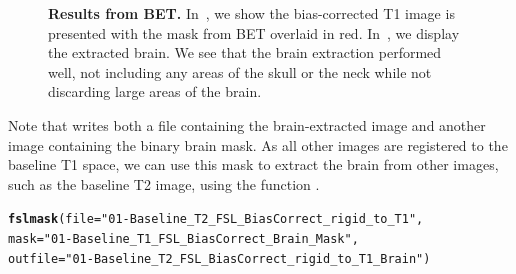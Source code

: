 \documentclass[a4paper]{report}\usepackage[]{graphicx}\usepackage[]{color}
\makeatletter
\newcommand{\hlstr}[1]{\textcolor[rgb]{0.192,0.494,0.8}{#1}}%
\newcommand{\hlstd}[1]{\textcolor[rgb]{0.345,0.345,0.345}{#1}}%
\newcommand{\hlkwc}[1]{\textcolor[rgb]{0.333,0.667,0.333}{#1}}%
\newcommand{\hlkwd}[1]{\textcolor[rgb]{0.737,0.353,0.396}{\textbf{#1}}}%
\newenvironment{kframe}{%
 \def\at@end@of@kframe{}%
 \ifinner\ifhmode%
  \def\at@end@of@kframe{\end{minipage}}%
  \begin{minipage}{\columnwidth}%
 \fi\fi%
 \def\FrameCommand##1{\hskip\@totalleftmargin \hskip-\fboxsep
 \colorbox{shadecolor}{##1}\hskip-\fboxsep
     \hskip-\linewidth \hskip-\@totalleftmargin \hskip\columnwidth}%
 \MakeFramed {\advance\hsize-\width
   \@totalleftmargin\z@ \linewidth\hsize
   \@setminipage}}%
 {\par\unskip\endMakeFramed%
 \at@end@of@kframe}
\newenvironment{knitrout}{}{} %
\newcommand\gobblepars{%
    \@ifnextchar\par%
        {\expandafter\gobblepars\@gobble}%
        {}}
\let\pkg=\strong
\DeclareRobustCommand\code{\bgroup\@noligs\@codex}
\makeatother
\begin{document}
\begin{article}
\begin{figure}
\hfill
\caption{{\bf Results from BET.} In~\protect{}, we show the bias-corrected T1 image is presented with the mask from BET overlaid in red.  In~\protect{}, we display the extracted brain.  We see that the brain extraction performed well, not including any areas of the skull or the neck while not discarding large areas of the brain.}
\label{fig:bet}
\end{figure}

Note that \code{fslbet} writes both a file containing the brain-extracted image and another image containing the binary brain mask.  As all other images are registered to the baseline T1 space, we can use this mask to extract the brain from other images, such as the baseline T2 image, using the \pkg{fslr} function \code{fslmask}.

\begin{knitrout}
\color{fgcolor}\begin{kframe}
\begin{alltt}
\hlkwd{fslmask}\hlstd{(}\hlkwc{file}\hlstd{=}\hlstr{"01-Baseline_T2_FSL_BiasCorrect_rigid_to_T1"}\hlstd{,}
        \hlkwc{mask} \hlstd{=} \hlstr{"01-Baseline_T1_FSL_BiasCorrect_Brain_Mask"}\hlstd{,}
        \hlkwc{outfile} \hlstd{=} \hlstr{"01-Baseline_T2_FSL_BiasCorrect_rigid_to_T1_Brain"}\hlstd{)}
\end{alltt}
\end{kframe}
\end{knitrout}
\gobblepars



\end{article}
\end{document}
